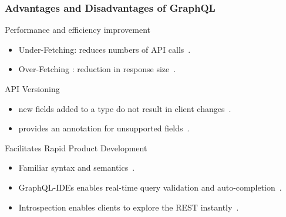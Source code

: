 \begin{frame}\frametitle{Advantages and Disadvantages of GraphQL}

\begin{block}{Performance and efficiency improvement}
\begin{itemize}
  \item Under-Fetching: reduces  numbers of API calls~\cite{migrating-to-gql}.
  \item Over-Fetching : reduction in response size~\cite{migrating-to-gql}.
\end{itemize}
\end{block}

\begin{block}{API Versioning}
\begin{itemize}
  \item new fields added to a type do not result in client changes~\cite{migrating-to-gql}. 
  \item provides an  annotation for unsupported fields~\cite{migrating-to-gql}. 
\end{itemize}

\end{block}

\begin{block}{Facilitates Rapid Product Development}


\begin{itemize}
  \item  Familiar syntax and semantics~\cite{rest-vs-gql-controlled-experiment}.
  \item GraphQL-IDEs enables real-time query validation and auto-completion~\cite{rest-vs-gql-controlled-experiment,migrating-to-gql}.
  \item Introspection enables clients to explore the REST instantly~\cite{migrating-to-gql}. 
\end{itemize}

\end{block}


\end{frame}

